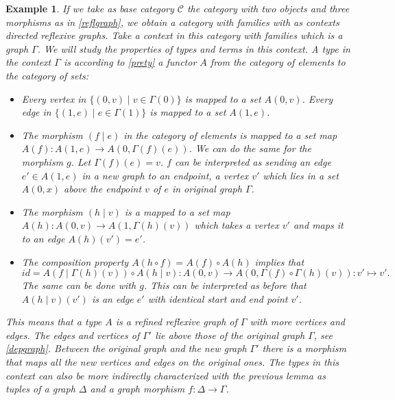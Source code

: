 \documentclass[11pt,a4paper,twoside,xetex,draft]{book}
\newtheorem{example}[theorem]{Example}
\begin{document}
\begin{example}
If we take as base category $\mathcal{C}$ the category with two objects and three morphisms as in \cref{reflgraph}, we obtain a category with families with as contexts directed reflexive graphs. Take a context in this category with families which is a graph $\Gamma$. We will study the properties of types and terms in this context. A type in the context $\Gamma$ is according to \cref{prety} a functor $A$ from the category of elements to the category of sets:
\begin{itemize}
\item Every vertex in $\{ (0, v) \mid v \in \Gamma (0) \}$ is mapped to a set $A(0,v)$. Every edge in $\{ (1, e) \mid e \in \Gamma (1) \}$ is mapped to a set $A(1,e)$.

\item The morphism $(f \mid e)$ in the category of elements is mapped to a set map $A(f): A(1,e) \rightarrow A(0, \Gamma (f) (e))$.  We can do the same for the morphism $g$. Let $\Gamma (f) (e) =v$. $f$ can be interpreted as sending an edge $e' \in A(1,e)$ in a new graph to an endpoint, a vertex $v'$ which lies in a set $A(0, x)$ above the endpoint $v$ of $e$ in original graph $\Gamma$.
 
\item The morphism $(h \mid v)$ is a mapped to a set map $A(h) : A(0,v) \rightarrow A(1, \Gamma (h) (v) )$ which takes a vertex $v'$ and maps it to an edge $A(h)(v')=e'$.

\item The composition property $A(h \circ f) = A(f) \circ A(h)$ implies that $$id = A \left( f \mid \Gamma (h) (v) \right) \circ A \left( h \mid v \right): A(0,v) \rightarrow A(0, \Gamma (f) \circ \Gamma (h) (v)): v' \mapsto v'.$$ The same can be done with $g$. This can be interpreted as before that $A(h \mid v)(v')$ is an edge $e'$ with identical start and end point $v'$.
\end{itemize}

This means that a type $A$ is a refined reflexive graph of $\Gamma$ with more vertices and edges. The edges and vertices of $\Gamma '$ lie above those of the original graph $\Gamma$, see \cref{depgraph}. Between the original graph and the new graph $\Gamma'$ there is a morphism that maps all the new vertices and edges on the original ones. The types in this context can also be more indirectly characterized with the previous lemma as tuples of a graph $\Delta$ and a graph morphism $f:\Delta \rightarrow \Gamma$.


\end{example}
\end{document}
